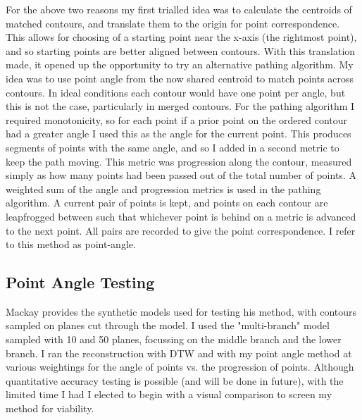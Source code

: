 \documentclass[11pt]{article}
\begin{document}
For the above two reasons my first trialled idea was to calculate the centroids of matched contours, and translate them to the origin for point correspondence. This allows for choosing of a starting point near the x-axis (the rightmost point), and so starting points are better aligned between contours. With this translation made, it opened up the opportunity to try an alternative pathing algorithm. My idea was to use point angle from the now shared centroid to match points across contours. In ideal conditions each contour would have one point per angle, but this is not the case, particularly in merged contours. For the pathing algorithm I required monotonicity, so for each point if a prior point on the ordered contour had a greater angle I used this as the angle for the current point. This produces segments of points with the same angle, and so I added in a second metric to keep the path moving. This metric was progression along the contour, measured simply as how many points had been passed out of the total number of points. A weighted sum of the angle and progression metrics is used in the pathing algorithm. A current pair of points is kept, and points on each contour are leapfrogged between such that whichever point is behind on a metric is advanced to the next point. All pairs are recorded to give the point correspondence. I refer to this method as point-angle.

\subsection{Point Angle Testing}

Mackay provides the synthetic models used for testing his method, with contours sampled on planes cut through the model. I used the "multi-branch" model sampled with 10 and 50 planes, focussing on the middle branch and the lower branch. I ran the reconstruction with DTW and with my point angle method at various weightings for the angle of points vs. the progression of points. Although quantitative accuracy testing is possible (and will be done in future), with the limited time I had I elected to begin with a visual comparison to screen my method for viability. 
\end{document}
